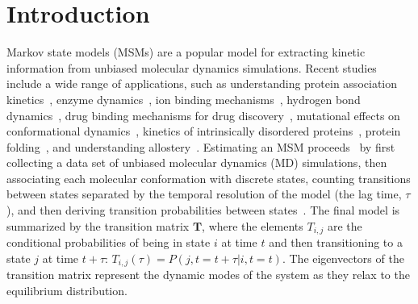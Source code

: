 \documentclass[journal=jacsat,manuscript=article]{achemso}
\begin{document}
\section{Introduction}

Markov state models (MSMs) are a popular model for extracting kinetic information from unbiased molecular dynamics simulations. Recent studies include a wide range of applications, such as understanding protein association kinetics~\cite{cannariato_prediction_2022, chakrabarti_litmus_2022}, enzyme dynamics~\cite{koulgi_structural_2021}, ion binding mechanisms~\cite{dutta_distinct_2022, mckiernan_dynamical_2020}, hydrogen bond dynamics~\cite{ibrahim_dynamics_2022}, drug binding mechanisms for drug discovery~\cite{hu_discovery_2022, pantsar_decisive_2022, hempel_molecular_2021, tosstorff_study_2020, liu_silico_2021}, mutational effects on conformational dynamics~\cite{fernandez-quintero_mutation_2021, sharma_comparative_2020, juarez-jimenezDynamicDesignManipulation2020b, wapeesittipanAllostericEffectsCyclophilin2019a}, kinetics of intrinsically disordered proteins~\cite{paul_diversity_2020}, protein folding~\cite{zhou_molecular_2021}, and understanding allostery~\cite{tian_deciphering_2020, bowman_msmallosteric_2015, pontiggia_msmcprotein_2015}. Estimating an MSM proceeds~\cite{noe_markov_2019} by first collecting a data set of unbiased molecular dynamics (MD) simulations, then associating each molecular conformation with discrete states, counting transitions between states separated by the temporal resolution of the model (the lag time, $\tau$), and then deriving transition probabilities between states~\cite{trendelkamp-schroer_estimation_2015}. The final model is summarized by the transition matrix $\mathbf{T}$, where the elements $T_{i, j}$ are the conditional probabilities of being in state $i$ at time $t$ and then transitioning to a state $j$ at time $t+\tau$: $T_{i,j}(\tau) = P(j, t=t+\tau| i, t=t)$.  The eigenvectors of the transition matrix represent the dynamic modes of the system as they relax to the equilibrium distribution. 
\end{document}
